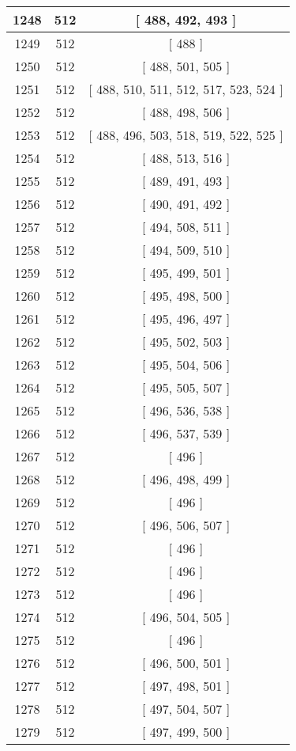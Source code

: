 \begin{center}
\begin{longtable}[H]{|| c c c ||}
\hline
1248 & 512 & [ 488, 492, 493 ] \\ 
\hline
1249 & 512 & [ 488 ] \\ 
\hline
1250 & 512 & [ 488, 501, 505 ] \\ 
\hline
1251 & 512 & [ 488, 510, 511, 512, 517, 523, 524 ] \\ 
\hline
1252 & 512 & [ 488, 498, 506 ] \\ 
\hline
1253 & 512 & [ 488, 496, 503, 518, 519, 522, 525 ] \\ 
\hline
1254 & 512 & [ 488, 513, 516 ] \\ 
\hline
1255 & 512 & [ 489, 491, 493 ] \\ 
\hline
1256 & 512 & [ 490, 491, 492 ] \\ 
\hline
1257 & 512 & [ 494, 508, 511 ] \\ 
\hline
1258 & 512 & [ 494, 509, 510 ] \\ 
\hline
1259 & 512 & [ 495, 499, 501 ] \\ 
\hline
1260 & 512 & [ 495, 498, 500 ] \\ 
\hline
1261 & 512 & [ 495, 496, 497 ] \\ 
\hline
1262 & 512 & [ 495, 502, 503 ] \\ 
\hline
1263 & 512 & [ 495, 504, 506 ] \\ 
\hline
1264 & 512 & [ 495, 505, 507 ] \\ 
\hline
1265 & 512 & [ 496, 536, 538 ] \\ 
\hline
1266 & 512 & [ 496, 537, 539 ] \\ 
\hline
1267 & 512 & [ 496 ] \\ 
\hline
1268 & 512 & [ 496, 498, 499 ] \\ 
\hline
1269 & 512 & [ 496 ] \\ 
\hline
1270 & 512 & [ 496, 506, 507 ] \\ 
\hline
1271 & 512 & [ 496 ] \\ 
\hline
1272 & 512 & [ 496 ] \\ 
\hline
1273 & 512 & [ 496 ] \\ 
\hline
1274 & 512 & [ 496, 504, 505 ] \\ 
\hline
1275 & 512 & [ 496 ] \\ 
\hline
1276 & 512 & [ 496, 500, 501 ] \\ 
\hline
1277 & 512 & [ 497, 498, 501 ] \\ 
\hline
1278 & 512 & [ 497, 504, 507 ] \\ 
\hline
1279 & 512 & [ 497, 499, 500 ] \\ 
\hline

\end{longtable}
\end{center}
